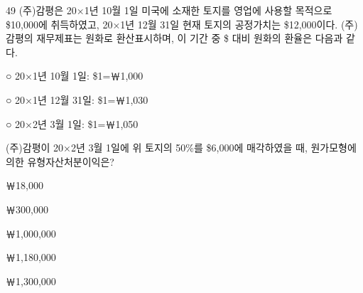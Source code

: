 \begin{question}{49}
(주)감평은 20×1년 10월 1일 미국에 소재한 토지를 영업에 사용할 목적으로 \$10,000에 취득하였고, 20×1년 12월 31일 현재 토지의 공정가치는 \$12,000이다. (주)감평의 재무제표는 원화로 환산표시하며, 이 기간 중 \$ 대비 원화의 환율은 다음과 같다.
\begin{framedtext}
○ 20×1년 10월 1일: \$1=￦1,000 \par
○ 20×1년 12월 31일: \$1=￦1,030 \par
○ 20×2년 3월 1일: \$1=￦1,050
\end{framedtext}
(주)감평이 20×2년 3월 1일에 위 토지의 50\%를 \$6,000에 매각하였을 때, 원가모형에 의한 유형자산처분이익은?
\begin{choices}
  \item ￦18,000
  \item ￦300,000
  \item ￦1,000,000
  \item ￦1,180,000
  \item ￦1,300,000
\end{choices}
\end{question}
